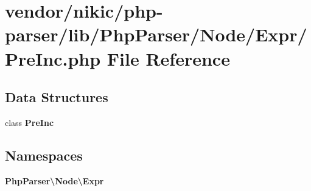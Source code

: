 \section{vendor/nikic/php-\/parser/lib/\+Php\+Parser/\+Node/\+Expr/\+Pre\+Inc.php File Reference}
\label{_pre_inc_8php}
\subsection*{Data Structures}
\begin{DoxyCompactItemize}
\item 
class {\bf Pre\+Inc}
\end{DoxyCompactItemize}
\subsection*{Namespaces}
\begin{DoxyCompactItemize}
\item 
 {\bf Php\+Parser\textbackslash{}\+Node\textbackslash{}\+Expr}
\end{DoxyCompactItemize}

